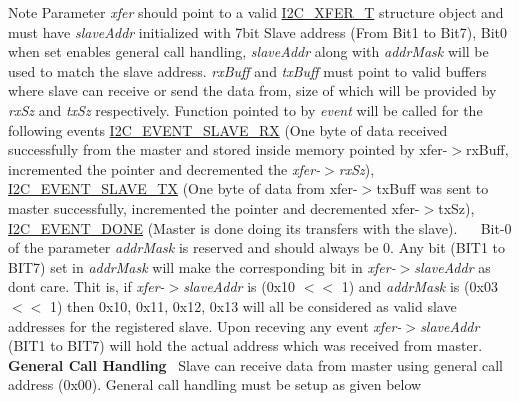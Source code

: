 \begin{DoxyNote}{Note}
Parameter {\itshape xfer} should point to a valid \hyperlink{struct_i2_c___x_f_e_r___t}{I2\+C\+\_\+\+X\+F\+E\+R\+\_\+T} structure object and must have {\itshape slave\+Addr} initialized with 7bit Slave address (From Bit1 to Bit7), Bit0 when set enables general call handling, {\itshape slave\+Addr} along with {\itshape addr\+Mask} will be used to match the slave address. {\itshape rx\+Buff} and {\itshape tx\+Buff} must point to valid buffers where slave can receive or send the data from, size of which will be provided by {\itshape rx\+Sz} and {\itshape tx\+Sz} respectively. Function pointed to by {\itshape event} will be called for the following events \hyperlink{i2c__18xx__43xx_8h_gacb2cd4e03ea48339d327e4f387441bf3a290fcc1bb657102af26daa1b84472848}{I2\+C\+\_\+\+E\+V\+E\+N\+T\+\_\+\+S\+L\+A\+V\+E\+\_\+\+RX} (One byte of data received successfully from the master and stored inside memory pointed by xfer-\/$>$rx\+Buff, incremented the pointer and decremented the {\itshape xfer-\/$>$rx\+Sz}), \hyperlink{i2c__18xx__43xx_8h_gacb2cd4e03ea48339d327e4f387441bf3a3911d9b6505f77f0bed3f21b2710ca58}{I2\+C\+\_\+\+E\+V\+E\+N\+T\+\_\+\+S\+L\+A\+V\+E\+\_\+\+TX} (One byte of data from xfer-\/$>$tx\+Buff was sent to master successfully, incremented the pointer and decremented xfer-\/$>$tx\+Sz), \hyperlink{i2c__18xx__43xx_8h_gacb2cd4e03ea48339d327e4f387441bf3a43d00f7d92100d4af6df5514e4ccf1d1}{I2\+C\+\_\+\+E\+V\+E\+N\+T\+\_\+\+D\+O\+NE} (Master is done doing its transfers with the slave).~\newline
 ~\newline
Bit-\/0 of the parameter {\itshape addr\+Mask} is reserved and should always be 0. Any bit (B\+I\+T1 to B\+I\+T7) set in {\itshape addr\+Mask} will make the corresponding bit in {\itshape xfer-\/$>$slave\+Addr} as don\textquotesingle{}t care. Thit is, if {\itshape xfer-\/$>$slave\+Addr} is (0x10 $<$$<$ 1) and {\itshape addr\+Mask} is (0x03 $<$$<$ 1) then 0x10, 0x11, 0x12, 0x13 will all be considered as valid slave addresses for the registered slave. Upon receving any event {\itshape xfer-\/$>$slave\+Addr} (B\+I\+T1 to B\+I\+T7) will hold the actual address which was received from master.~\newline
 ~\newline
{\bfseries General Call Handling}~\newline
 Slave can receive data from master using general call address (0x00). General call handling must be setup as given below
\begin{DoxyItemize}

\end{DoxyItemize}
\end{DoxyNote}
